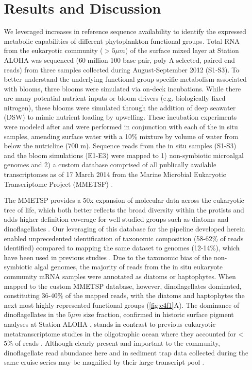 \section{Results and Discussion}
We leveraged increases in reference sequence availability \citep{Keeling2014} to identify the expressed metabolic capabilities of different phytoplankton functional groups. Total RNA from the eukaryotic community ($>5 \mu m$) of the surface mixed layer at Station ALOHA was sequenced (60 million 100 base pair, poly-A selected, paired end reads) from three samples collected during August-September 2012 (S1-S3). To better understand the underlying functional group-specific metabolism associated with blooms, three blooms were simulated via on-deck incubations. While there are many potential nutrient inputs or bloom drivers (e.g. biologically fixed nitrogen), these blooms were simulated through the addition of deep seawater (DSW) to mimic nutrient loading by upwelling.  These incubation experiments were modeled after \citet{McAndrew2007} and were performed in conjunction with each of the in situ samples, amending surface water with a 10\% mixture by volume of water from below the nutricline (700 m). Sequence reads from the in situ samples (S1-S3) and the bloom simulations (E1-E3) were mapped to 1) non-symbiotic microalgal genomes and 2) a custom database comprised of all publically available transcriptomes as of 17 March 2014 from the Marine Microbial Eukaryotic Transcriptome Project (MMETSP) \citep{Keeling2014}.\par 
The MMETSP provides a 50x expansion of molecular data across the eukaryotic tree of life, which both better reflects the broad diversity within the protists and adds higher-definition coverage for well-studied groups such as diatoms and dinoflagellates \citep{Keeling2014}. Our leveraging of this database for the pipeline developed herein enabled unprecedented identification of taxonomic composition (58-62\% of reads identified) compared to mapping the same dataset to genomes (12-14\%), which have been used in previous studies \citep{Marchetti2012a}. Due to the taxonomic bias of the non-symbiotic algal genomes, the majority of reads from the in situ eukaryote community mRNA samples were annotated as diatoms or haptophytes. When mapped to the custom MMETSP database, however, dinoflagellates dominated, constituting 36-40\% of the mapped reads, with the diatoms and haptophytes the next most highly represented functional groups (\cref{fig:c4f1}A). The dominance of dinoflagellates in the $5 \mu m$ size fraction, confirmed in historic surface pigment analyses at Station ALOHA \citep{Letelier1993}, stands in contrast to previous eukaryotic metatranscriptome studies in the oligotrophic ocean where they accounted for < 5\% of reads \citep{Marchetti2012a}. Although clearly present and important to the community, dinoflagellate read abundance here and in sediment trap data collected during the same cruise series \citep{Fontanez2015} may be magnified by their large transcript pool \citep{Moustafa2010, Hackett2004}. \par


